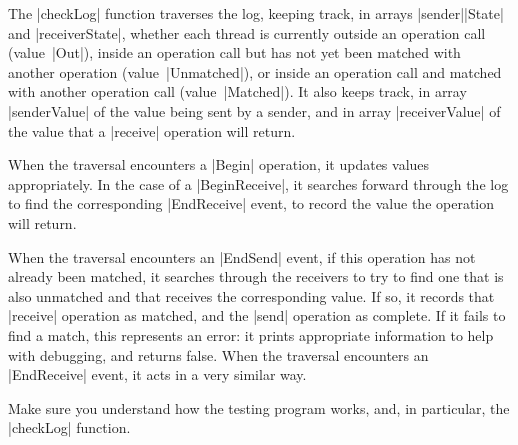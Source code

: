 The |checkLog| function traverses the log, keeping track, in arrays
|sender|\-|State| and |receiverState|, whether each thread is currently
outside an operation call (value~|Out|), inside an operation call but has not
yet been matched with another operation (value~|Unmatched|), or inside an
operation call and matched with another operation call (value~|Matched|).  It
also keeps track, in array |senderValue| of the value being sent by a sender,
and in array |receiverValue| of the value that a |receive| operation will
return.

When the traversal encounters a |Begin| operation, it updates values
appropriately.  In the case of a |BeginReceive|, it searches forward through
the log to find the corresponding |EndReceive| event, to record the value the
operation will return.

When the traversal encounters an |EndSend| event, if this operation has not
already been matched, it searches through the receivers to try to find one
that is also unmatched and that receives the corresponding value.  If so, it
records that |receive| operation as matched, and the |send| operation as
complete.  If it fails to find a match, this represents an error: it prints
appropriate information to help with debugging, and returns false.  When the
traversal encounters an |EndReceive| event, it acts in a very similar way.

\begin{instruction}
Make sure you understand how the testing program works, and, in particular,
the |checkLog| function.
\end{instruction}




